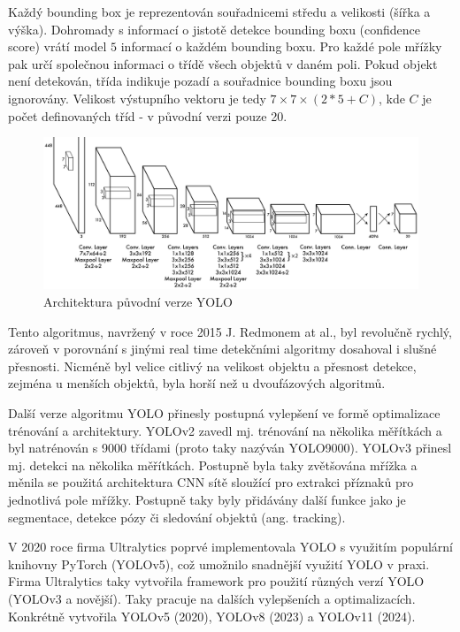 Každý bounding box je reprezentován souřadnicemi středu a velikosti (šířka a
výška). Dohromady s informací o jistotě detekce bounding boxu (confidence
score) vrátí model $5$ informací o každém bounding boxu. Pro každé pole mřížky
pak určí společnou informaci o třídě všech objektů v daném poli. Pokud objekt
není detekován, třída indikuje pozadí a souřadnice bounding boxu jsou
ignorovány. Velikost výstupního vektoru je tedy $7 \times 7 \times (2 * 5 +
    C)$, kde $C$ je počet definovaných tříd - v původní verzi pouze 20.

\begin{figure}[]
    \centering
    \includegraphics[width=\textwidth]{Figures/yolo}
    \caption{Architektura původní verze YOLO \cite{yolo}}
    \label{fig:yolo}
\end{figure}

Tento algoritmus, navržený v roce 2015 J. Redmonem at al., byl revolučně
rychlý, zároveň v porovnání s jinými real time detekčními algoritmy dosahoval i
slušné přesnosti. Nicméně byl velice citlivý na velikost objektu a přesnost
detekce, zejména u menších objektů, byla horší než u dvoufázových algoritmů.

Další verze algoritmu YOLO přinesly postupná vylepšení ve formě optimalizace
trénování a architektury. YOLOv2 \cite{yolo9000} zavedl mj. trénování na
několika měřítkách a byl natrénován s 9000 třídami (proto taky nazýván
YOLO9000). YOLOv3 \cite{yolov3} přinesl mj. detekci na několika měřítkách.
Postupně byla taky zvětšována mřížka a měnila se použitá architektura CNN sítě
sloužící pro extrakci příznaků pro jednotlivá pole mřížky. Postupně taky byly
přidávány další funkce jako je segmentace, detekce pózy či sledování objektů
(ang. tracking).

V 2020 roce firma Ultralytics poprvé implementovala YOLO s využitím populární
knihovny PyTorch (YOLOv5), což umožnilo snadnější využití YOLO v praxi. Firma
Ultralytics taky vytvořila framework pro použití různých verzí YOLO (YOLOv3 a
novější). Taky pracuje na dalších vylepšeních a optimalizacích. Konkrétně
vytvořila YOLOv5 (2020), YOLOv8 (2023) a YOLOv11 (2024).

